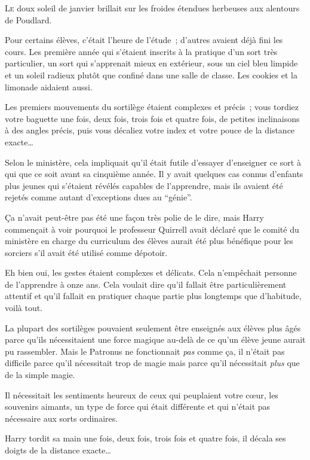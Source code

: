 
\lettrine{L}{e} doux soleil de janvier brillait sur les froides étendues herbeuses aux alentours de Poudlard.

Pour certains élèves, c'était l'heure de l'étude~; d'autres avaient déjà fini les cours. Les première année qui s'étaient inscrits à la pratique d'un sort très particulier, un sort qui s'apprenait mieux en extérieur, sous un ciel bleu limpide et un soleil radieux plutôt que confiné dans une salle de classe. Les cookies et la limonade aidaient aussi.

Les premiers mouvements du sortilège étaient complexes et précis~; vous tordiez votre baguette une fois, deux fois, trois fois et quatre fois, de petites inclinaisons à des angles précis, puis vous décaliez votre index et votre pouce de la distance exacte…

Selon le ministère, cela impliquait qu'il était futile d'essayer d'enseigner ce sort à qui que ce soit avant sa cinquième année. Il y avait quelques cas connus d'enfants plus jeunes qui s'étaient révélés capables de l'apprendre, mais ils avaient été rejetés comme autant d'exceptions dues au “génie”.

Ça n'avait peut-être pas été une façon très polie de le dire, mais Harry commençait à voir pourquoi le professeur Quirrell avait déclaré que le comité du ministère en charge du curriculum des élèves aurait été plus bénéfique pour les sorciers s'il avait été utilisé comme dépotoir.

Eh bien oui, les gestes étaient complexes et délicats. Cela n'empêchait personne de l'apprendre à onze ans. Cela voulait dire qu'il fallait être particulièrement attentif et qu'il fallait en pratiquer chaque partie plus longtemps que d'habitude, voilà tout.

La plupart des sortilèges pouvaient seulement être enseignés aux élèves plus âgés parce qu'ils nécessitaient une force magique au-delà de ce qu'un élève jeune aurait pu rassembler. Mais le Patronus ne fonctionnait \emph{pas} comme ça, il n'était pas difficile parce qu'il nécessitait trop de magie mais parce qu'il nécessitait \emph{plus} que de la simple magie.

Il nécessitait les sentiments heureux de ceux qui peuplaient votre cœur, les souvenirs aimants, un type de force qui était différente et qui n'était pas nécessaire aux sorts ordinaires.

Harry tordit sa main une fois, deux fois, trois fois et quatre fois, il décala ses doigts de la distance exacte…

